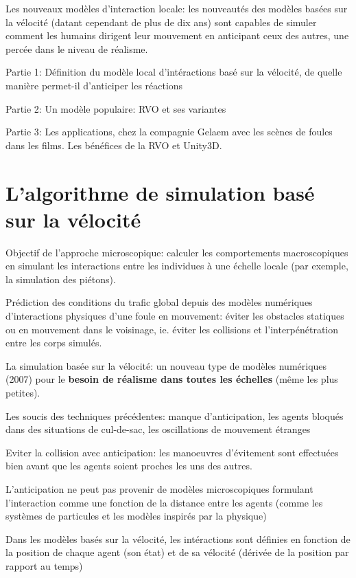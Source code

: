 \documentclass[11pt]{report}
\begin{document}
Les nouveaux modèles d'interaction locale: les nouveautés des modèles basées sur la vélocité (datant cependant de plus de dix ans) sont capables de simuler comment les humains dirigent leur mouvement en anticipant ceux des autres, une percée dans le niveau de réalisme.

Partie 1: Définition du modèle local d'intéractions basé sur la vélocité, de quelle manière permet-il d'anticiper les réactions

Partie 2: Un modèle populaire: RVO et ses variantes

Partie 3: Les applications, chez la compagnie Gelaem avec les scènes de foules dans les films. Les bénéfices de la RVO et Unity3D.


\section{L'algorithme de simulation basé sur la vélocité}

Objectif de l'approche microscopique: calculer les comportements macroscopiques en simulant les interactions entre les individues à une échelle locale (par exemple, la simulation des piétons).

Prédiction des conditions du trafic global depuis des modèles numériques d'interactions physiques d'une foule en mouvement: éviter les obstacles statiques ou en mouvement dans le voisinage, ie. éviter les collisions et l'interpénétration entre les corps simulés.

La simulation basée sur la vélocité: un nouveau type de modèles numériques (2007) pour le \textbf{besoin de réalisme dans toutes les échelles} (même les plus petites).

Les soucis des techniques précédentes: manque d'anticipation, les agents bloqués dans des situations de cul-de-sac, les oscillations de mouvement étranges

Eviter la collision avec anticipation: les manoeuvres d'évitement sont effectuées bien avant que les agents soient proches les uns des autres.

L'anticipation ne peut pas provenir de modèles microscopiques formulant l'interaction comme une fonction de la distance entre les agents (comme les systèmes de particules et les modèles inspirés par la physique)

Dans les modèles basés sur la vélocité, les intéractions sont définies en fonction de la position de chaque agent (son état) et de sa vélocité (dérivée de la position par rapport au temps)
\end{document}
